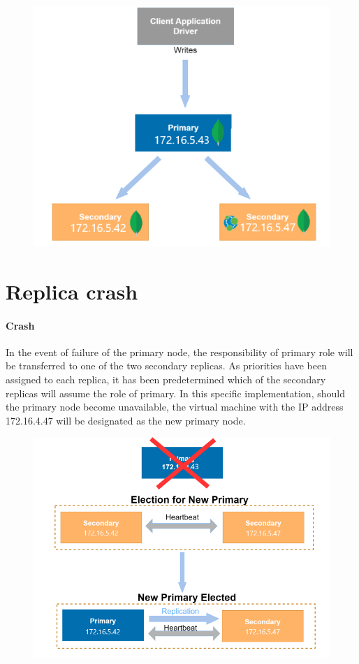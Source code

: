 \begin{figure}[H]
	\centering
	\includegraphics[width=0.66\linewidth]{assets/replicaServerWrites}
	\caption{}
	\label{fig:replicaserverwrites}
\end{figure}


\section{Replica crash}

\paragraph{Crash}In the event of failure of the primary node, the 
responsibility of primary role will be transferred to one of the two secondary 
replicas. As priorities have been assigned to each replica, it has been 
predetermined which of the secondary replicas will assume the role of primary. 
In this specific implementation, should the primary node become unavailable, 
the virtual machine with the IP address 172.16.4.47 will be designated as the 
new primary node. 

\begin{figure}[H]
	\centering
	\includegraphics[width=0.88\linewidth]{assets/newPrimary}
	\caption{}
	\label{fig:newprimary}
\end{figure}


